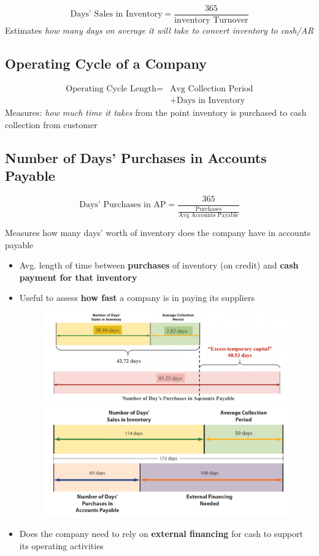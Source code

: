 \documentclass{article}
\begin{document}
\begin{multicols}{2}
$$\text{Days' Sales in Inventory} = \frac{365}{\text{inventory Turnover}}$$
Estimates \textit{how many days on average it will take to convert inventory to cash/AR}

\subsection{Operating Cycle of a Company}
\begin{equation*}
\begin{aligned}
\text{Operating Cycle Length} = & \text{Avg Collection Period} \\&+ \text{Days in Inventory}
\end{aligned}
\end{equation*}
Measures: \textit{how much time it takes} from the point inventory is purchased to cash collection from customer

\subsection{Number of Days' Purchases in Accounts Payable}
$$\text{Days' Purchases in AP} = \frac{365}{\frac{\text{Purchases}}{\text{Avg Accounts Payable}}}$$

Measures how many days' worth of inventory does the company have in accounts payable
\begin{itemize}
	\item Avg. length of time between \textbf{purchases} of inventory (on credit) and \textbf{cash payment for that inventory}
	\item Useful to assess \textbf{how fast} a company is in paying its suppliers
	\begin{figure}[H]
		\centering
		\includegraphics[width=\columnwidth]{image/operating_cycle.png}
		\includegraphics[width=\columnwidth]{image/caterpillar_opcycle.png}
	\end{figure}
    \item Does the company need to rely on \textbf{external financing} for cash to support its operating activities
\end{itemize}


\end{multicols}
\end{document}

